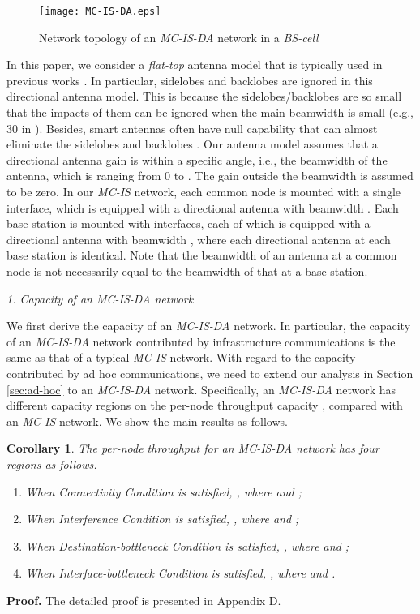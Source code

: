 \documentclass[10pt,journal]{IEEEtran}
\newtheorem{corollary}{Corollary}
\def\done{\hspace*{\fill} }
\begin{document}
\begin{figure}[t]
\centering
\texttt{[image: MC-IS-DA.eps]}
\caption{Network topology of an \emph{MC-IS-DA} network in a \emph{BS-cell}}
\label{fig:MC-IS-DA}
\end{figure}


In this paper, we consider a \emph{flat-top} antenna model that is typically used in previous works \cite{Su:2003,hndai:infocom2008,Nitsche:IEEEComMag14}. In particular, sidelobes and backlobes are ignored in this directional antenna model. This is because the sidelobes/backlobes are so small that the impacts of them can be ignored when the main beamwidth is small (e.g., 30 in \cite{Ramanathan:2001}). Besides, smart antennas often have null capability that can almost eliminate the sidelobes and backlobes \cite{Balanis:2005}. Our antenna model assumes that a directional antenna gain is within a specific angle, i.e., the beamwidth of the antenna, which is ranging from 0 to . The gain outside the beamwidth is assumed to be zero. In our \emph{MC-IS} network, each common node is mounted with a single interface, which is equipped with a directional antenna with beamwidth . Each base station is mounted with  interfaces, each of which is equipped with a directional antenna with beamwidth , where each directional antenna at each base station is identical. Note that the beamwidth  of an antenna at a common node is not necessarily equal to the beamwidth  of that at a base station. 

\emph{1. Capacity of an MC-IS-DA network}

We first derive the capacity of an \emph{MC-IS-DA} network. In particular, the capacity of an \emph{MC-IS-DA} network contributed by infrastructure communications is the same as that of a typical \emph{MC-IS} network. With regard to the capacity contributed by ad hoc communications, we need to extend our analysis in Section \ref{sec:ad-hoc} to an \emph{MC-IS-DA} network. Specifically, an \emph{MC-IS-DA} network has different capacity regions on the per-node throughput capacity , compared with an \emph{MC-IS} network. We show the main results as follows.

\begin{corollary}
\label{cor:throughput}
The per-node throughput  for an \textit{MC-IS-DA} network has four regions as follows.
\begin{enumerate}
\item [i)] When \textit{Connectivity Condition} is satisfied, , where  and ;
\item [ii)] When \textit{Interference Condition} is satisfied, , where  and ;
\item [iii)] When \textit{Destination-bottleneck Condition} is satisfied, , where  and ;
\item [iv)] When \textit{Interface-bottleneck Condition} is satisfied, , where  and .
\end{enumerate}
\end{corollary}
\textbf{Proof.}
The detailed proof is presented in Appendix D.
\done
\end{document}
